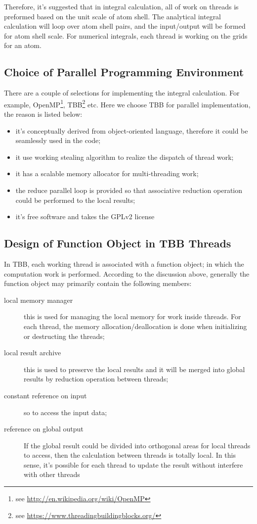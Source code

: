 Therefore, it's suggested that in integral calculation, all of work on threads is preformed 
based on the unit scale of atom shell. The analytical integral calculation will loop over 
atom shell pairs, and the input/output will be formed for atom shell scale. For numerical 
integrals, each thread is working on the grids for an atom.



\subsection{Choice of Parallel Programming Environment}
%
%
%
There are a couple of selections for implementing the integral calculation. For example,
OpenMP\footnote{see \url{http://en.wikipedia.org/wiki/OpenMP}}, TBB\footnote{
see \url{https://www.threadingbuildingblocks.org/}} etc. Here we choose TBB for parallel
implementation, the reason is listed below:
\begin{itemize}
 \item  it's conceptually derived from object-oriented language, therefore it 
 could be seamlessly used in the code;
 \item  it use working stealing algorithm to realize the dispatch of thread work;
 \item  it has a scalable memory allocator for multi-threading work;
 \item  the reduce parallel loop is provided so that associative reduction operation
 could be performed to the local results;
 \item  it's free software and takes the GPLv2 license
\end{itemize}

\subsection{Design of Function Object in TBB Threads}
%
%
%
In TBB, each working thread is associated with a function object; in which the computation
work is performed. According to the discussion above, generally the function object
may primarily contain the following members:
\begin{description}
 \item [local memory manager] this is used for managing the local memory for work inside
       threads. For each thread, the memory allocation/deallocation is done when initializing
       or destructing the threads;
 \item [local result archive] this is used to preserve the local results and it will be 
       merged into global results by reduction operation between threads;
 \item [constant reference on input] so to access the input data;
 \item [reference on global output] If the global result could be divided into orthogonal 
       areas for local threads to access, then the calculation between threads is totally
       local. In this sense, it's possible for each thread to update the result without 
       interfere with other threads
\end{description}


